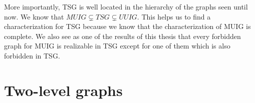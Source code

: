 More importantly, TSG is well located in the hierarchy of the graphs seen until now. We know that $MUIG \subsetneq TSG \subsetneq UUIG$. This helps us to find a characterization for TSG because we know that the characterization of MUIG is complete. We also see as one of the results of this thesis that every forbidden graph for MUIG is realizable in TSG except for one of them which is also forbidden in TSG.

\section*{Two-level graphs}
